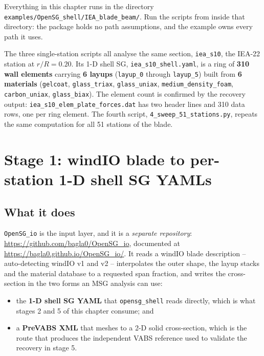 Everything in this chapter runs in the directory
\texttt{examples/OpenSG\_shell/IEA\_blade\_beam/}. Run the scripts from inside
that directory: the package holds no path assumptions, and the example owns
every path it uses.

The three single-station scripts all analyse the same section,
\texttt{iea\_s10}, the IEA-22 station at $r/R = 0.20$. Its 1-D shell SG,
\texttt{iea\_s10\_shell.yaml}, is a ring of \textbf{310 wall elements} carrying
\textbf{6 layups} (\texttt{layup\_0} through \texttt{layup\_5}) built from
\textbf{6 materials} (\texttt{gelcoat}, \texttt{glass\_triax},
\texttt{glass\_uniax}, \texttt{medium\_density\_foam}, \texttt{carbon\_uniax},
\texttt{glass\_biax}). The element count is confirmed by the recovery output:
\texttt{iea\_s10\_elem\_plate\_forces.dat} has two header lines and 310 data
rows, one per ring element. The fourth script,
\texttt{4\_sweep\_51\_stations.py}, repeats the same computation for all 51
stations of the blade.

\section{Stage 1: windIO blade to per-station 1-D shell SG YAMLs}
\label{sec:windio:stage1}

\subsection*{What it does}

\texttt{OpenSG\_io} is the input layer, and it is a \emph{separate repository}:
\url{https://github.com/bagla0/OpenSG_io}, documented at
\url{https://bagla0.github.io/OpenSG_io/}. It reads a windIO blade description
-- auto-detecting windIO v1 and v2 -- interpolates the outer shape, the layup
stacks and the material database to a requested span fraction, and writes the
cross-section in the two forms an MSG analysis can use:

\begin{itemize}
  \item the \textbf{1-D shell SG YAML} that \texttt{opensg\_shell} reads
        directly, which is what stages 2 and 5 of this chapter consume; and
  \item a \textbf{PreVABS XML} that meshes to a 2-D solid cross-section, which
        is the route that produces the independent VABS reference used to
        validate the recovery in stage 5.
\end{itemize}

